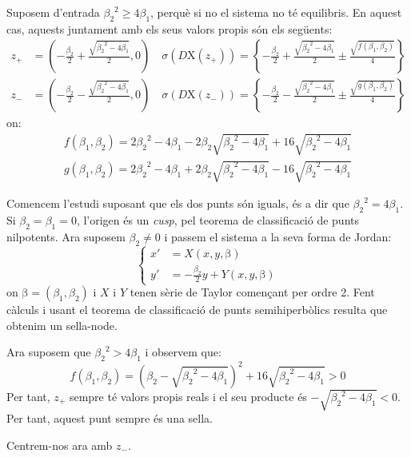 \documentclass[a4paper]{article}
\newcommand{\vf}[1]{\boldsymbol{\mathrm{#1}}} %
\theoremstyle{definition}
\begin{document}
Suposem d'entrada ${\beta_2}^2\geq 4\beta_1$, perquè si no el sistema no té equilibris. En aquest cas, aquests juntament amb els seus valors propis són els següents:
\begin{align*}
  z_+ & =\left(-\frac{\beta_2}{2}+\frac{\sqrt{{\beta_2}^2-4\beta_1}}{2},0\right)\quad \sigma(D\vf{X}(z_+))=\left\{-\frac{\beta_2}{2}+\frac{\sqrt{{\beta_2}^2-4\beta_1}}{2}\pm\frac{\sqrt{f(\beta_1,\beta_2)}}{4}\right\} \\
  z_- & =\left(-\frac{\beta_2}{2}-\frac{\sqrt{{\beta_2}^2-4\beta_1}}{2},0\right)\quad \sigma(D\vf{X}(z_-))=\left\{-\frac{\beta_2}{2}-\frac{\sqrt{{\beta_2}^2-4\beta_1}}{2}\pm\frac{\sqrt{g(\beta_1,\beta_2)}}{4}\right\}
\end{align*}
on:
\begin{align*}
  f(\beta_1,\beta_2)=2{\beta_2}^2-4\beta_1-2\beta_2\sqrt{{\beta_2}^2-4\beta_1}+16\sqrt{{\beta_2}^2-4\beta_1} \\
  g(\beta_1,\beta_2)=2{\beta_2}^2-4\beta_1+2\beta_2\sqrt{{\beta_2}^2-4\beta_1}-16\sqrt{{\beta_2}^2-4\beta_1}
\end{align*}

Comencem l'estudi suposant que els dos punts són iguals, és a dir que ${\beta_2}^2=4\beta_1$. Si $\beta_2=\beta_1=0$, l'origen és un \emph{cusp}, pel teorema de classificació de punts nilpotents. Ara suposem $\beta_2\ne 0$ i passem el sistema a la seva forma de Jordan:
\begin{equation}
  \left\{
  \begin{aligned}
    x' & =X(x,y,\vf\beta)                     \\
    y' & =-\frac{\beta_2}{2}y+Y(x,y,\vf\beta)
  \end{aligned}
  \right.
\end{equation}
on $\vf\beta=(\beta_1,\beta_2)$ i $X$ i $Y$ tenen sèrie de Taylor començant per ordre 2. Fent càlculs i usant el teorema de classificació de punts semihiperbòlics resulta que obtenim un sella-node.

Ara suposem que ${\beta_2}^2>4\beta_1$ i observem que: $$f(\beta_1,\beta_2)={\left(\beta_2-\sqrt{{\beta_2}^2-4\beta_1}\right)}^2+16\sqrt{{\beta_2}^2-4\beta_1}> 0$$
Per tant, $z_+$ sempre té valors propis reals i el seu producte és $-\sqrt{{\beta_2}^2-4\beta_1}< 0$. Per tant, aquest punt sempre és una sella.

Centrem-nos ara amb $z_-$.
\end{document}
